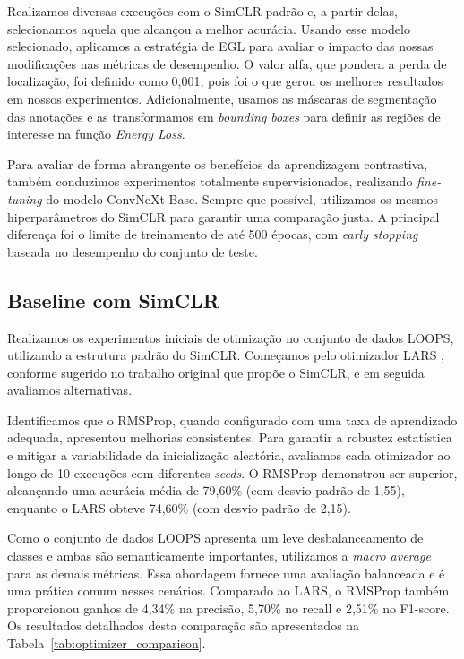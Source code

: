 Realizamos diversas execuções com o SimCLR padrão e, a partir delas, selecionamos aquela que alcançou a melhor acurácia. Usando esse modelo selecionado, aplicamos a estratégia de EGL para avaliar o impacto das nossas modificações nas métricas de desempenho. O valor alfa, que pondera a perda de localização, foi definido como 0,001, pois foi o que gerou os melhores resultados em nossos experimentos. Adicionalmente, usamos as máscaras de segmentação das anotações e as transformamos em \textit{bounding boxes} para definir as regiões de interesse na função \textit{Energy Loss}.

Para avaliar de forma abrangente os benefícios da aprendizagem contrastiva, também conduzimos experimentos totalmente supervisionados, realizando \textit{fine-tuning} do modelo ConvNeXt Base. Sempre que possível, utilizamos os mesmos hiperparâmetros do SimCLR para garantir uma comparação justa. A principal diferença foi o limite de treinamento de até 500 épocas, com \textit{early stopping} baseada no desempenho do conjunto de teste.

\subsection{Baseline com SimCLR}

Realizamos os experimentos iniciais de otimização no conjunto de dados LOOPS, utilizando a estrutura padrão do SimCLR. Começamos pelo otimizador LARS \cite{lars}, conforme sugerido no trabalho original que propõe o SimCLR, e em seguida avaliamos alternativas.

Identificamos que o RMSProp, quando configurado com uma taxa de aprendizado adequada, apresentou melhorias consistentes. Para garantir a robustez estatística e mitigar a variabilidade da inicialização aleatória, avaliamos cada otimizador ao longo de 10 execuções com diferentes \textit{seeds}. O RMSProp demonstrou ser superior, alcançando uma acurácia média de 79,60\% (com desvio padrão de 1,55), enquanto o LARS obteve 74,60\% (com desvio padrão de 2,15).

Como o conjunto de dados LOOPS apresenta um leve desbalanceamento de classes e ambas são semanticamente importantes, utilizamos a \textit{macro average} para as demais métricas. Essa abordagem fornece uma avaliação balanceada e é uma prática comum nesses cenários. Comparado ao LARS, o RMSProp também proporcionou ganhos de 4,34\% na precisão, 5,70\% no recall e 2,51\% no F1-score. Os resultados detalhados desta comparação são apresentados na Tabela~\ref{tab:optimizer_comparison}.

